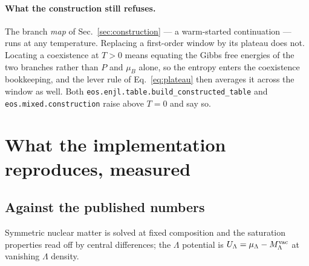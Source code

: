 \documentclass[aps,prc,onecolumn,superscriptaddress,nofootinbib,10pt]{revtex4-2}
\newcommand{\muB}{\mu_B}
\begin{document}
\paragraph{What the construction still refuses.} The branch \emph{map} of
Sec.~\ref{sec:construction} --- a warm-started continuation --- runs at any
temperature. Replacing a first-order window by its plateau does not. Locating
a coexistence at $T > 0$ means equating the Gibbs free energies of the two
branches rather than $P$ and $\muB$ alone, so the entropy enters the
coexistence bookkeeping, and the lever rule of Eq.~\eqref{eq:plateau} then
averages it across the window as well. Both
\texttt{eos.enjl.table.build\_constructed\_table} and
\texttt{eos.mixed.construction} raise above $T = 0$ and say so.

\section{What the implementation reproduces, measured}
\label{sec:validation}

\subsection{Against the published numbers}

Symmetric nuclear matter is solved at fixed composition and the saturation
properties read off by central differences; the $\Lambda$ potential is
$U_\Lambda = \mu_\Lambda - M_\Lambda^{\rm vac}$ at vanishing $\Lambda$
density.
\end{document}

